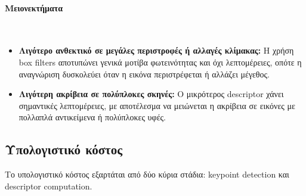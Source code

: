 \documentclass[12pt]{article}
\begin{document}
\paragraph{Μειονεκτήματα}
\mbox{}\\
\begin{itemize}
  \item \textbf{Λιγότερο ανθεκτικό σε μεγάλες περιστροφές ή αλλαγές κλίμακας:} Η χρήση box filters αποτυπώνει γενικά μοτίβα φωτεινότητας και όχι λεπτομέρειες, οπότε η αναγνώριση δυσκολεύει όταν η εικόνα περιστρέφεται ή αλλάζει μέγεθος. 
  \item \textbf{Λιγότερη ακρίβεια σε πολύπλοκες σκηνές:} Ο μικρότερος descriptor χάνει σημαντικές λεπτομέρειες, με αποτέλεσμα να μειώνεται η ακρίβεια σε εικόνες με πολλαπλά αντικείμενα ή πολύπλοκες υφές.
\end{itemize}

\subsection{Υπολογιστικό κόστος}
Το υπολογιστικό κόστος εξαρτάται από δύο κύρια στάδια: keypoint detection και descriptor computation.
\end{document}
